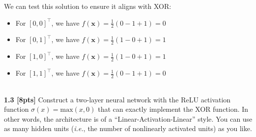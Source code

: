 \documentclass{article}
\begin{document}
{We can test this solution to ensure it aligns with XOR:
\begin{itemize}
    \item For $[0,0]^{\top}$, we have $f(\mathbf{x})= \frac{1}{2}(0-1+1)= 0$ 
    \item For $[0,1]^{\top}$, we have $f(\mathbf{x})= \frac{1}{2}(1-0+1)= 1$ 
    \item For $[1,0]^{\top}$, we have $f(\mathbf{x})= \frac{1}{2}(1-0+1)= 1$
    \item For $[1,1]^{\top}$, we have $f(\mathbf{x})= \frac{1}{2}(0-1+1)= 0$
\end{itemize}
}\\

\noindent
\textbf{1.3 [8pts]} Construct a two-layer neural network with the ReLU activation function $\sigma(x)= \text{max}(x,0)$ that can exactly implement the XOR function. In other words, the architecture is of a “Linear-Activation-Linear” style. You can use as many hidden units (\textit{i.e.}, the number of nonlinearly activated units) as you like.\\
\end{document}
